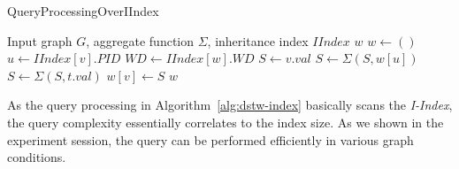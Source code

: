 \begin{algorithm}
\caption{QueryProcessingOverIIndex}
\begin{algorithmic}[1]
\Require Input graph $G$, aggregate function $\Sigma$, inheritance index $IIndex$ 
\Ensure $w$ 
\State $w \leftarrow ()$
 \label{code:dstw-index-tp1}
	\State $u \leftarrow IIndex[v].PID$
	\State $WD \leftarrow IIndex[w].WD$
	\State $S \leftarrow v.val$
	\State $S \leftarrow \Sigma(S, w[u])$
	 \label{code:dstw-index-tp2}
		\State $S\leftarrow \Sigma(S, t.val)$
	\EndFor
	\State $w[v] \leftarrow S$
\EndFor
\Return $w$
\end{algorithmic}
\label{alg:dstw-index}
\end{algorithm}

As the query processing in Algorithm~\ref{alg:dstw-index} basically scans the \emph{I-Index}, the query
complexity essentially correlates to the index size. As we shown in the experiment session, the query can be performed efficiently 
in various graph conditions. 


